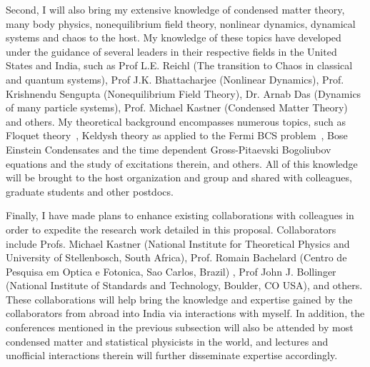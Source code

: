 \documentclass[a4paper,11pt,color]{article}
\begin{document}
Second, I will also bring my extensive knowledge of condensed matter theory, many body physics, nonequilibrium field theory, nonlinear dynamics, dynamical systems and chaos to the host. My knowledge of these topics have developed under the guidance of several leaders in their respective fields in the United States and India, such as Prof L.E. Reichl (The transition to Chaos in classical and quantum systems), Prof J.K. Bhattacharjee (Nonlinear Dynamics), Prof. Krishnendu Sengupta (Nonequilibrium Field Theory), Dr. Arnab Das (Dynamics of many particle systems), Prof. Michael Kastner (Condensed Matter Theory) and others. My theoretical background encompasses numerous topics, such as  Floquet theory~\cite{floquet}, Keldysh theory as applied to the Fermi BCS problem~\cite{bcs}, Bose Einstein Condensates and the time dependent Gross-Pitaevski Bogoliubov equations and the study of excitations therein, and others. All of this knowledge will be brought to the host organization and group and shared with colleagues, graduate students and other postdocs.

Finally, I have made plans to enhance existing collaborations with colleagues in order to expedite the research work detailed in this proposal. Collaborators include  Profs. Michael Kastner  (National Institute for Theoretical Physics and University of Stellenbosch, South Africa), Prof. Romain Bachelard (Centro de Pesquisa em Optica e Fotonica, Sao Carlos, Brazil)  , Prof  John J. Bollinger (National Institute of Standards and Technology, Boulder, CO USA), and others. These collaborations will help bring the knowledge and expertise gained by the collaborators from abroad into India via interactions with myself. In addition, the conferences  mentioned in the previous subsection will also be attended by most condensed matter and statistical physicists in the world, and lectures and unofficial interactions therein will further disseminate expertise accordingly.
\end{document}
